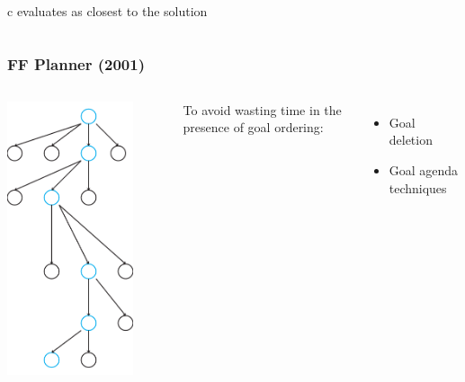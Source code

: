 \documentclass{beamer}
\let\origframetitle=\frametitle
\renewcommand\frametitle[1]{\origframetitle{\textbf{\large{\textrm{#1}}}}}
\begin{document}
\begin{frame}
\begin{columns}
\begin{itemize}
c evaluates as closest to the solution
\end{itemize}
\end{columns}
\end{frame}


\begin{frame}
  \frametitle{FF Planner (2001)}
\begin{columns}

  \includegraphics[width=0.8\textwidth]{images/ffplan.pdf}

  To avoid wasting time in the presence of goal ordering:

  \begin{itemize}
    \item Goal deletion
    \item Goal agenda techniques
  \end{itemize}
\end{columns}
\end{frame}
\end{document}
